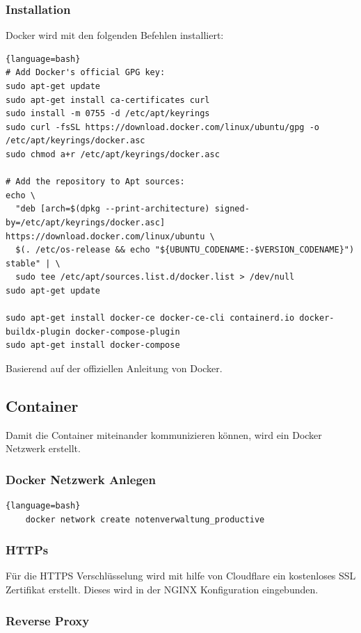\documentclass[11pt]{article}
\begin{document}
    \subsubsection{Installation}
    Docker wird mit den folgenden Befehlen installiert:
    \begin{lstlisting}{language=bash}
# Add Docker's official GPG key:
sudo apt-get update
sudo apt-get install ca-certificates curl
sudo install -m 0755 -d /etc/apt/keyrings
sudo curl -fsSL https://download.docker.com/linux/ubuntu/gpg -o /etc/apt/keyrings/docker.asc
sudo chmod a+r /etc/apt/keyrings/docker.asc

# Add the repository to Apt sources:
echo \
  "deb [arch=$(dpkg --print-architecture) signed-by=/etc/apt/keyrings/docker.asc] https://download.docker.com/linux/ubuntu \
  $(. /etc/os-release && echo "${UBUNTU_CODENAME:-$VERSION_CODENAME}") stable" | \
  sudo tee /etc/apt/sources.list.d/docker.list > /dev/null
sudo apt-get update
        
sudo apt-get install docker-ce docker-ce-cli containerd.io docker-buildx-plugin docker-compose-plugin
sudo apt-get install docker-compose
    \end{lstlisting}
    Basierend auf der offiziellen Anleitung von Docker\cite{docker-ubuntu-install}.


    \subsection{Container}
    Damit die Container miteinander kommunizieren können, wird ein Docker Netzwerk erstellt.
    \subsubsection{Docker Netzwerk Anlegen}
    \begin{lstlisting}{language=bash}
    docker network create notenverwaltung_productive
    \end{lstlisting}


    \subsubsection{HTTPs}
    Für die HTTPS Verschlüsselung wird mit hilfe von Cloudflare ein kostenloses SSL Zertifikat erstellt.
    Dieses wird in der NGINX Konfiguration eingebunden.



    \subsubsection{Reverse Proxy}
\end{document}
